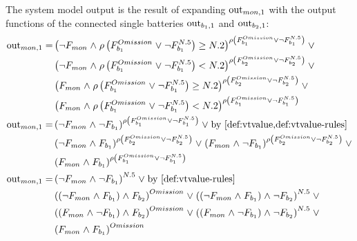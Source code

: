 The system model output is the result of expanding $\mathrm{out}_{mon,1}$ with the output functions of the connected single batteries $\mathrm{out}_{b_1,1}$ and $\mathrm{out}_{b_2,1}$:
\begin{align*}
\cout{mon}{1} = 
  &\left( 
    \lnot F_{mon} \land \VTValue\left( F_{b_1}^{Omission} \lor 
    \lnot F_{b_1}^{N.5} \right) \geq N.2
  \right)^{\VTValue\left( F_{b_1}^{Omission} \lor 
    \lnot F_{b_1}^{N.5} \right)} \lor \\
  & \left(
    \lnot F_{mon} \land \VTValue\left( F_{b_1}^{Omission} \lor 
    \lnot F_{b_1}^{N.5}\right) < N.2
  \right)^{\VTValue\left( F_{b_2}^{Omission} \lor 
    \lnot F_{b_2}^{N.5} \right) } \lor \\
  & \left(
    F_{mon} \land \VTValue\left( F_{b_1}^{Omission} \lor 
    \lnot F_{b_1}^{N.5}\right) \geq N.2
  \right)^{\VTValue\left(F_{b_2}^{Omission} \lor 
    \lnot F_{b_2}^{N.5} \right)} \lor \\
  & \left(
    F_{mon} \land \VTValue\left( F_{b_1}^{Omission} \lor 
    \lnot F_{b_1}^{N.5}\right) < N.2
  \right)^{\VTValue\left( F_{b_1}^{Omission} \lor 
    \lnot F_{b_1}^{N.5}\right)}\\
\cout{mon}{1} =
  &\left( 
    \lnot F_{mon} \land \lnot F_{b_1}  
  \right)^{\VTValue\left( F_{b_1}^{Omission} \lor 
    \lnot F_{b_1}^{N.5} \right)} \lor \text{by \cref{def:vtvalue,def:vtvalue-rules}}\\
  & \left(
    \lnot F_{mon} \land F_{b_1}
  \right)^{\VTValue\left( F_{b_2}^{Omission} \lor 
    \lnot F_{b_2}^{N.5} \right) } \lor 
  \left(
    F_{mon} \land \lnot F_{b_1}
  \right)^{\VTValue\left(F_{b_2}^{Omission} \lor 
    \lnot F_{b_2}^{N.5} \right)} \lor \\
  & \left(
    F_{mon} \land F_{b_1}
  \right)^{\VTValue\left( F_{b_1}^{Omission} \lor 
    \lnot F_{b_1}^{N.5}\right)}\\
\cout{mon}{1} =
  &\left( 
    \lnot F_{mon} \land \lnot F_{b_1}  
  \right)^{N.5} \lor \text{by \cref{def:vtvalue-rules}}\\
  & \left(
    \left(\lnot F_{mon} \land F_{b_1}\right) \land F_{b_2} 
  \right)^{Omission } \lor  
  \left(
    \left(\lnot F_{mon} \land F_{b_1}\right) \land \lnot F_{b_2}
  \right)^{N.5} \lor \\ 
  & \left(
    \left(F_{mon} \land \lnot F_{b_1}\right) \land F_{b_2}
  \right)^{Omission} \lor
  \left(
    \left(F_{mon} \land \lnot F_{b_1} \right) \land \lnot F_{b_2}
  \right)^{N.5} \lor \\
  & \left(
    F_{mon} \land F_{b_1}
  \right)^{Omission}
\end{align*}


